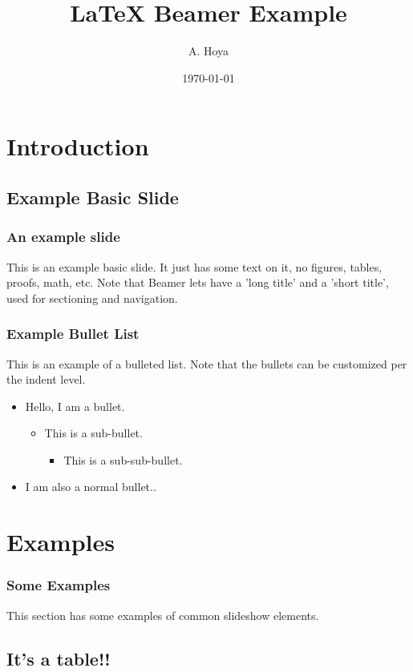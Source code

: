 \documentclass{beamer}
\title[Shorter Title]{LaTeX Beamer Example}
\author[Shorter Name]{A. Hoya}
\institute[Shorter Affiliation]{Georgetown University}
\date{\today}
\begin{document}
\frame{\titlepage}

\section[Outline]{}
\frame{\tableofcontents}

\section{Introduction}
\subsection[Basic Slide]{Example Basic Slide}

\frame
{
	\frametitle{An example slide}
	
	This is an example basic slide. It just has some text on it, no figures, tables, proofs, math, etc.  Note that Beamer lets have a 'long title' and a 'short title', used for sectioning and navigation.
}

\frame
{
	\frametitle{Example Bullet List}

	This is an example of a bulleted list. Note that the bullets can be customized per the indent level.
	
	\begin{itemize}
	\item Hello, I am a bullet.
	\begin{itemize}
		\item This is a sub-bullet.
		\begin{itemize}
			\item This is a sub-sub-bullet.
		\end{itemize}
	\end{itemize}
	\vspace{\baselineskip}
	\item I am also a normal bullet..
	\end{itemize}
}

\section{Examples}

\frame
{
	\frametitle{Some Examples}

	This section has some examples of common slideshow elements.
}

\subsection{It's a table!!}
\end{document}
